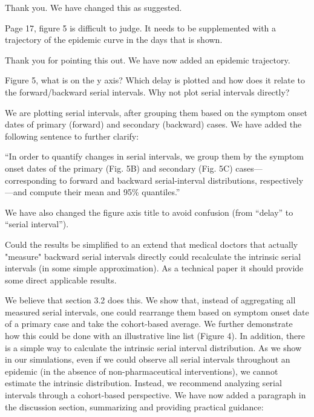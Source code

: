 \documentclass[12pt]{article}
\newcommand{\revtext}{\textsf}
\begin{document}
Thank you. We have changed this as suggested.

\revtext{Page 17, figure 5 is difficult to judge. It needs to be supplemented with a trajectory of the epidemic curve in the days that is shown.}

Thank you for pointing this out. We have now added an epidemic trajectory.

\revtext{Figure 5, what is on the y axis? Which delay is plotted and how does it relate to the forward/backward serial intervals. Why not plot serial intervals directly?}

We are plotting serial intervals, after grouping them based on the symptom onset dates of primary (forward) and secondary (backward) cases. We have added the following sentence to further clarify:

``In order to quantify changes in serial intervals, we group them by the symptom onset dates of the primary (Fig. 5B) and secondary (Fig. 5C) cases---corresponding to forward and backward serial-interval distributions, respectively---and compute their mean and 95\% quantiles.''

We have also changed the figure axis title to avoid confusion (from ``delay'' to ``serial interval'').

\revtext{Could the results be simplified to an extend that medical doctors that actually "measure" backward serial intervals directly could recalculate the intrinsic serial intervals (in some simple approximation). As a technical paper it should provide some direct applicable results.}

We believe that section 3.2 does this. We show that, instead of aggregating all measured serial intervals, one could rearrange them based on symptom onset date of a primary case and take the cohort-based average. We further demonstrate how this could be done with an illustrative line list (Figure 4). In addition, there is a simple way to calculate the intrinsic serial interval distribution. As we show in our simulations, even if we could observe all serial intervals throughout an epidemic (in the absence of non-pharmaceutical interventions), we cannot estimate the intrinsic distribution. Instead, we recommend analyzing serial intervals through a cohort-based perspective. We have now added a paragraph in the discussion section, summarizing and providing practical guidance:
\end{document}
